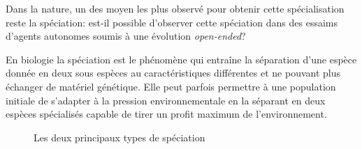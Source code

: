 \documentclass[a4paper,10pt]{report}
\begin{document}
Dans la nature, un des moyen les plus observé pour obtenir cette spécialisation reste la spéciation: est-il possible d'observer cette spéciation dans des essaims d'agents autonomes soumis à une évolution \emph{open-ended}?

En biologie la spéciation est le phénomène qui entraîne la séparation d'une espèce donnée en deux sous espèces au caractéristiques différentes et ne pouvant plus échanger de matériel génétique. Elle peut parfois permettre à une population initiale de s'adapter à la pression environnementale en la séparant en deux espèces spécialisés capable de tirer un profit maximum de l'environnement.


\begin{figure}[H]
\centering
{}
\hfil
{}

\caption{Les deux principaux types de spéciation}
\label{fig:speciation}
\end{figure}
\end{document}
